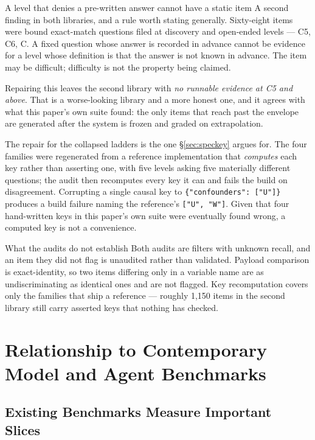 \begin{claimbox}{A level that denies a pre-written answer cannot have a static item}
A second finding in both libraries, and a rule worth stating generally. Sixty-eight items were bound exact-match questions filed at discovery and open-ended levels --- C5, C6, C\Om{}. A fixed question whose answer is recorded in advance cannot be evidence for a level whose definition is that the answer is not known in advance. The item may be difficult; difficulty is not the property being claimed.

Repairing this leaves the second library with \emph{no runnable evidence at C5 and above}. That is a worse-looking library and a more honest one, and it agrees with what this paper's own suite found: the only items that reach past the envelope are generated after the system is frozen and graded on extrapolation.
\end{claimbox}

The repair for the collapsed ladders is the one \S\ref{sec:speckey} argues for. The four families were regenerated from a reference implementation that \emph{computes} each key rather than asserting one, with five levels asking five materially different questions; the audit then recomputes every key it can and fails the build on disagreement. Corrupting a single causal key to \texttt{\{"confounders": ["U"]\}} produces a build failure naming the reference's \texttt{["U", "W"]}. Given that four hand-written keys in this paper's own suite were eventually found wrong, a computed key is not a convenience.

\begin{cautionbox}{What the audits do not establish}
Both audits are filters with unknown recall, and an item they did not flag is unaudited rather than validated. Payload comparison is exact-identity, so two items differing only in a variable name are as undiscriminating as identical ones and are not flagged. Key recomputation covers only the families that ship a reference --- roughly 1{,}150 items in the second library still carry asserted keys that nothing has checked.
\end{cautionbox}

\section{Relationship to Contemporary Model and Agent Benchmarks}

\subsection{Existing Benchmarks Measure Important Slices}

